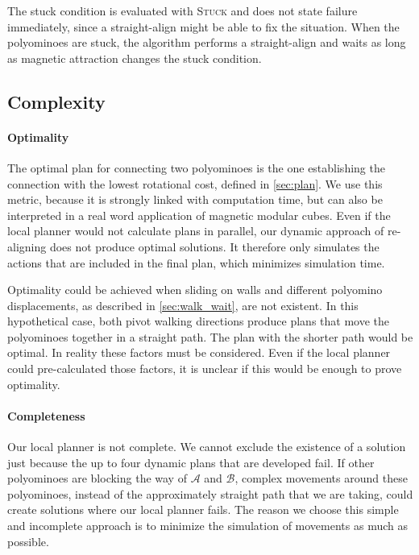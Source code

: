 The stuck condition is evaluated with {\scshape Stuck} and does not state failure immediately, since a straight-align might be able to fix the situation.
When the polyominoes are stuck, the algorithm performs a straight-align and waits as long as magnetic attraction changes the stuck condition.

\subsection{Complexity}
\label{sec:local_complex}

\paragraph{Optimality}

The optimal plan for connecting two polyominoes is the one establishing the connection with the lowest rotational cost, defined in \autoref{sec:plan}.
We use this metric, because it is strongly linked with computation time, but can also be interpreted in a real word application of magnetic modular cubes.
Even if the local planner would not calculate plans in parallel, our dynamic approach of re-aligning does not produce optimal solutions.
It therefore only simulates the actions that are included in the final plan, which minimizes simulation time.

Optimality could be achieved when sliding on walls and different polyomino displacements, as described in \autoref{sec:walk_wait}, are not existent.
In this hypothetical case, both pivot walking directions produce plans that move the polyominoes together in a straight path.
The plan with the shorter path would be optimal.
In reality these factors must be considered.
Even if the local planner could pre-calculated those factors, it is unclear if this would be enough to prove optimality.

\paragraph{Completeness}

Our local planner is not complete.
We cannot exclude the existence of a solution just because the up to four dynamic plans that are developed fail.
If other polyominoes are blocking the way of $\mathcal{A}$ and $\mathcal{B}$, complex movements around these polyominoes, instead of the approximately straight path that we are taking, could create solutions where our local planner fails.
The reason we choose this simple and incomplete approach is to minimize the simulation of movements as much as possible. 




